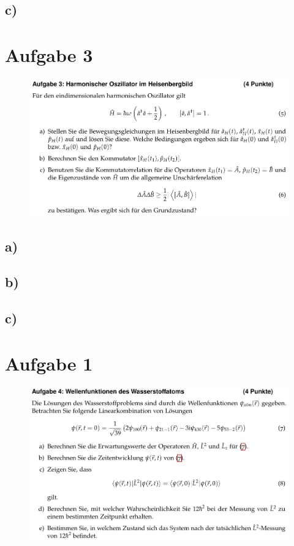 \subsection{c)}

\section{Aufgabe 3}

    \begin{figure}[H]
        \centering
        \includegraphics[width=\textwidth]{images/Aufgabe3.jpg}
        \label{fig:4}
    \end{figure}

\subsection{a)}

\subsection{b)}

\subsection{c)}

\section{Aufgabe 1}

    \begin{figure}[H]
        \centering
        \includegraphics[width=\textwidth]{images/Aufgabe4.jpg}
        \label{fig:5}
    \end{figure}

